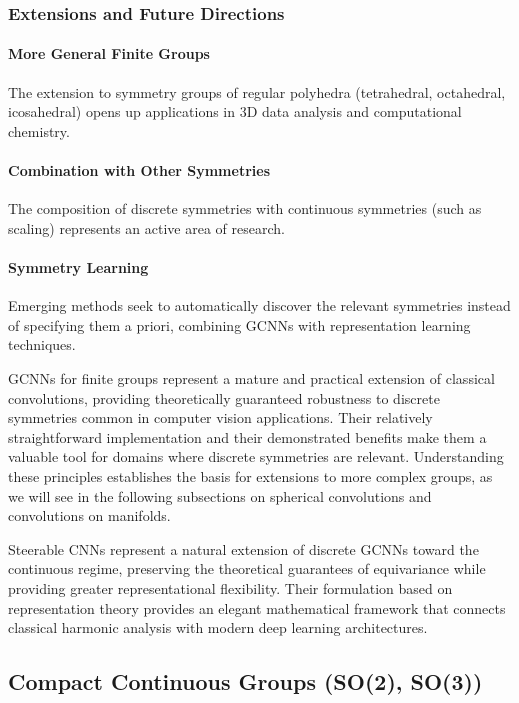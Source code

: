 \subsubsection{Extensions and Future Directions}

\paragraph{More General Finite Groups}

The extension to symmetry groups of regular polyhedra (tetrahedral, octahedral, icosahedral) opens up applications in 3D data analysis and computational chemistry.

\paragraph{Combination with Other Symmetries}

The composition of discrete symmetries with continuous symmetries (such as scaling) represents an active area of research.

\paragraph{Symmetry Learning}

Emerging methods seek to automatically discover the relevant symmetries instead of specifying them a priori, combining \glspl{GCNN} with representation learning techniques.

\glspl{GCNN} for finite groups represent a mature and practical extension of classical convolutions, providing theoretically guaranteed robustness to discrete symmetries common in computer vision applications. Their relatively straightforward implementation and their demonstrated benefits make them a valuable tool for domains where discrete symmetries are relevant. Understanding these principles establishes the basis for extensions to more complex groups, as we will see in the following subsections on spherical convolutions and convolutions on manifolds.


Steerable \glspl{CNN} represent a natural extension of discrete \glspl{GCNN} toward the continuous regime, preserving the theoretical guarantees of equivariance while providing greater representational flexibility. Their formulation based on representation theory provides an elegant mathematical framework that connects classical harmonic analysis with modern deep learning architectures.

\subsection{Compact Continuous Groups (SO(2), SO(3))}\label{subsec:grupos_continuos_compactos}

